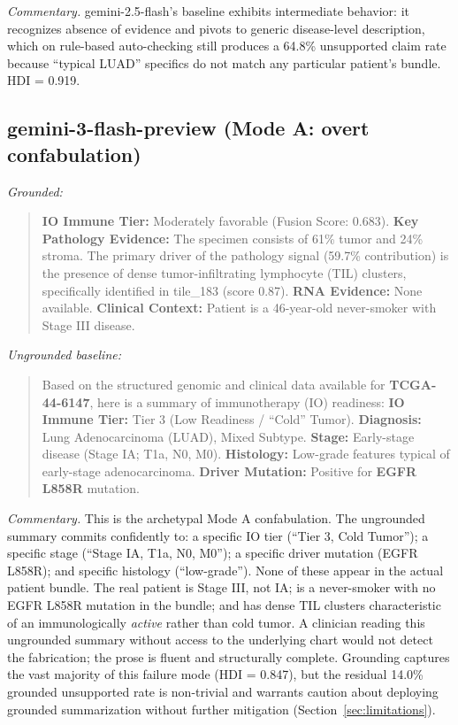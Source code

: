 \documentclass{article}
\theoremstyle{plain}
\begin{document}
\emph{Commentary.} gemini-2.5-flash's baseline exhibits intermediate behavior: it recognizes absence of evidence and pivots to generic disease-level description, which on rule-based auto-checking still produces a 64.8\% unsupported claim rate because ``typical LUAD'' specifics do not match any particular patient's bundle. HDI = 0.919.

\subsection{gemini-3-flash-preview (Mode A: overt confabulation)}

\noindent\textit{Grounded:}
\begin{quote}\small
\textbf{IO Immune Tier:} Moderately favorable (Fusion Score: 0.683). \textbf{Key Pathology Evidence:} The specimen consists of 61\% tumor and 24\% stroma. The primary driver of the pathology signal (59.7\% contribution) is the presence of dense tumor-infiltrating lymphocyte (TIL) clusters, specifically identified in tile\_183 (score 0.87). \textbf{RNA Evidence:} None available. \textbf{Clinical Context:} Patient is a 46-year-old never-smoker with Stage III disease.
\end{quote}

\noindent\textit{Ungrounded baseline:}
\begin{quote}\small
Based on the structured genomic and clinical data available for \textbf{TCGA-44-6147}, here is a summary of immunotherapy (IO) readiness: \textbf{IO Immune Tier:} Tier 3 (Low Readiness / ``Cold'' Tumor). \textbf{Diagnosis:} Lung Adenocarcinoma (LUAD), Mixed Subtype. \textbf{Stage:} Early-stage disease (Stage IA; T1a, N0, M0). \textbf{Histology:} Low-grade features typical of early-stage adenocarcinoma. \textbf{Driver Mutation:} Positive for \textbf{EGFR L858R} mutation.
\end{quote}

\emph{Commentary.} This is the archetypal Mode A confabulation. The ungrounded summary commits confidently to: a specific IO tier (``Tier 3, Cold Tumor''); a specific stage (``Stage IA, T1a, N0, M0''); a specific driver mutation (EGFR L858R); and specific histology (``low-grade''). None of these appear in the actual patient bundle. The real patient is Stage III, not IA; is a never-smoker with no EGFR L858R mutation in the bundle; and has dense TIL clusters characteristic of an immunologically \emph{active} rather than cold tumor. A clinician reading this ungrounded summary without access to the underlying chart would not detect the fabrication; the prose is fluent and structurally complete. Grounding captures the vast majority of this failure mode (HDI = 0.847), but the residual 14.0\% grounded unsupported rate is non-trivial and warrants caution about deploying grounded summarization without further mitigation (Section~\ref{sec:limitations}).
\end{document}
